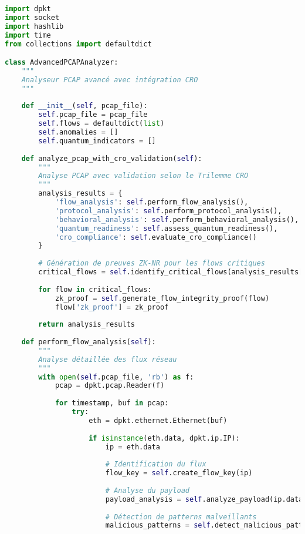 \begin{lstlisting}[language=Python, caption=Système de capture PCAP avec validation d'intégrité]
import dpkt
import socket
import hashlib
import time
from collections import defaultdict

class AdvancedPCAPAnalyzer:
    """
    Analyseur PCAP avancé avec intégration CRO
    """
    
    def __init__(self, pcap_file):
        self.pcap_file = pcap_file
        self.flows = defaultdict(list)
        self.anomalies = []
        self.quantum_indicators = []
        
    def analyze_pcap_with_cro_validation(self):
        """
        Analyse PCAP avec validation selon le Trilemme CRO
        """
        analysis_results = {
            'flow_analysis': self.perform_flow_analysis(),
            'protocol_analysis': self.perform_protocol_analysis(),
            'behavioral_analysis': self.perform_behavioral_analysis(),
            'quantum_readiness': self.assess_quantum_readiness(),
            'cro_compliance': self.evaluate_cro_compliance()
        }
        
        # Génération de preuves ZK-NR pour les flows critiques
        critical_flows = self.identify_critical_flows(analysis_results['flow_analysis'])
        
        for flow in critical_flows:
            zk_proof = self.generate_flow_integrity_proof(flow)
            flow['zk_proof'] = zk_proof
            
        return analysis_results
    
    def perform_flow_analysis(self):
        """
        Analyse détaillée des flux réseau
        """
        with open(self.pcap_file, 'rb') as f:
            pcap = dpkt.pcap.Reader(f)
            
            for timestamp, buf in pcap:
                try:
                    eth = dpkt.ethernet.Ethernet(buf)
                    
                    if isinstance(eth.data, dpkt.ip.IP):
                        ip = eth.data
                        
                        # Identification du flux
                        flow_key = self.create_flow_key(ip)
                        
                        # Analyse du payload
                        payload_analysis = self.analyze_payload(ip.data)
                        
                        # Détection de patterns malveillants
                        malicious_patterns = self.detect_malicious_patterns(ip.data)
                        

\end{lstlisting}
